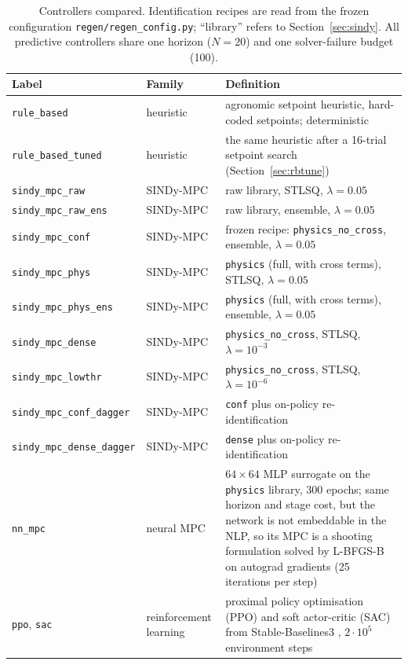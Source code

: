 \begin{table}[htbp]
\centering
\caption{Controllers compared. Identification recipes are read from the frozen
configuration \texttt{regen/regen\_config.py}; ``library'' refers to
Section~\ref{sec:sindy}. All predictive controllers share one horizon ($N=20$) and one
solver-failure budget (100).}
\label{tab:controllers}
\small
\setlength{\tabcolsep}{4pt}
\begin{tabular}{@{}llp{6.4cm}@{}}
\toprule
Label & Family & Definition \\
\midrule
\texttt{rule\_based} & heuristic & agronomic setpoint heuristic, hard-coded setpoints; deterministic \\
\texttt{rule\_based\_tuned} & heuristic & the same heuristic after a 16-trial setpoint search (Section~\ref{sec:rbtune}) \\
\texttt{sindy\_mpc\_raw} & SINDy-MPC & raw library, STLSQ, $\lambda=0.05$ \\
\texttt{sindy\_mpc\_raw\_ens} & SINDy-MPC & raw library, ensemble, $\lambda=0.05$ \\
\texttt{sindy\_mpc\_conf} & SINDy-MPC & frozen recipe: \texttt{physics\_no\_cross}, ensemble, $\lambda=0.05$ \\
\texttt{sindy\_mpc\_phys} & SINDy-MPC & \texttt{physics} (full, with cross terms), STLSQ, $\lambda=0.05$ \\
\texttt{sindy\_mpc\_phys\_ens} & SINDy-MPC & \texttt{physics} (full, with cross terms), ensemble, $\lambda=0.05$ \\
\texttt{sindy\_mpc\_dense} & SINDy-MPC & \texttt{physics\_no\_cross}, STLSQ, $\lambda=10^{-3}$ \\
\texttt{sindy\_mpc\_lowthr} & SINDy-MPC & \texttt{physics\_no\_cross}, STLSQ, $\lambda=10^{-6}$ \\
\texttt{sindy\_mpc\_conf\_dagger} & SINDy-MPC & \texttt{conf} plus on-policy re-identification \\
\texttt{sindy\_mpc\_dense\_dagger} & SINDy-MPC & \texttt{dense} plus on-policy re-identification \\
\texttt{nn\_mpc} & neural MPC & $64{\times}64$ MLP surrogate on the \texttt{physics} library, 300 epochs; same horizon and stage cost, but the network is not embeddable in the NLP, so its MPC is a shooting formulation solved by L-BFGS-B on autograd gradients (25 iterations per step) \\
\texttt{ppo}, \texttt{sac} & reinforcement learning & proximal policy optimisation (PPO) \cite{schulman2017} and soft actor-critic (SAC) \cite{haarnoja2018} from Stable-Baselines3 \cite{raffin2021}, $2\cdot10^{5}$ environment steps \\

\end{tabular}
\end{table}
